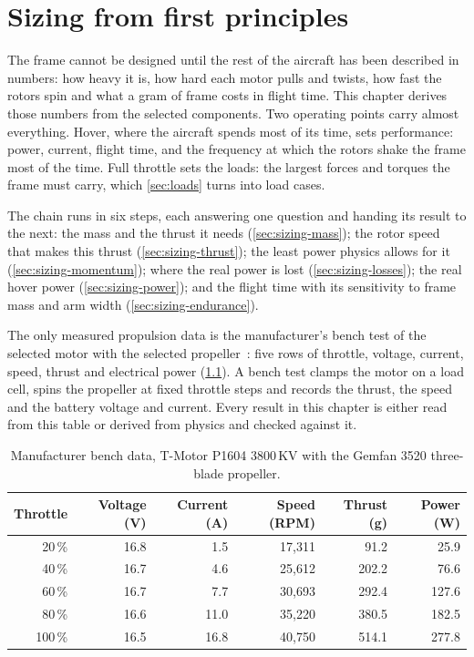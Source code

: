 \chapter{Sizing from first principles}\label{sec:sizing}

The frame cannot be designed until the rest of the aircraft has been described in numbers: how heavy it is, how hard each motor pulls and twists, how fast the rotors spin and what a gram of frame costs in flight time. This chapter derives those numbers from the selected components. Two operating points carry almost everything. Hover, where the aircraft spends most of its time, sets performance: power, current, flight time, and the frequency at which the rotors shake the frame most of the time. Full throttle sets the loads: the largest forces and torques the frame must carry, which \cref{sec:loads} turns into load cases.

The chain runs in six steps, each answering one question and handing its result to the next: the mass and the thrust it needs (\cref{sec:sizing-mass}); the rotor speed that makes this thrust (\cref{sec:sizing-thrust}); the least power physics allows for it (\cref{sec:sizing-momentum}); where the real power is lost (\cref{sec:sizing-losses}); the real hover power (\cref{sec:sizing-power}); and the flight time with its sensitivity to frame mass and arm width (\cref{sec:sizing-endurance}).

The only measured propulsion data is the manufacturer's bench test of the selected motor with the selected propeller~\citep{tmotor_p1604}: five rows of throttle, voltage, current, speed, thrust and electrical power (\cref{tab:sizing-bench}). A bench test clamps the motor on a load cell, spins the propeller at fixed throttle steps and records the thrust, the speed and the battery voltage and current. Every result in this chapter is either read from this table or derived from physics and checked against it.

\begin{table}[htbp]
\centering\small
\caption{Manufacturer bench data, T-Motor P1604 3800\,KV with the Gemfan 3520 three-blade propeller.}\label{tab:sizing-bench}
\begin{tabular}{@{}rrrrrr@{}}
\toprule
Throttle & Voltage (V) & Current (A) & Speed (RPM) & Thrust (g) & Power (W)\\
\midrule
20\,\% & 16.8 & 1.5 & 17,311 & 91.2 & 25.9\\
40\,\% & 16.7 & 4.6 & 25,612 & 202.2 & 76.6\\
60\,\% & 16.7 & 7.7 & 30,693 & 292.4 & 127.6\\
80\,\% & 16.6 & 11.0 & 35,220 & 380.5 & 182.5\\
100\,\% & 16.5 & 16.8 & 40,750 & 514.1 & 277.8\\
\bottomrule
\end{tabular}
\end{table}

